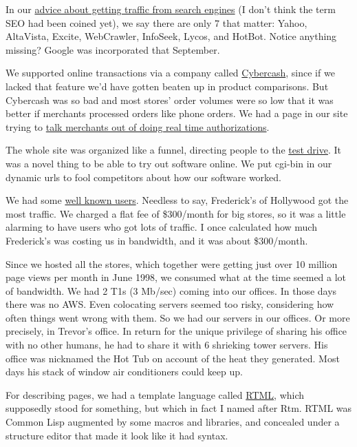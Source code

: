 In our \href{http://ycombinator.com/viaweb/se.html}{advice about getting
traffic from search engines} (I don't think the term SEO had been coined
yet), we say there are only 7 that matter: Yahoo, AltaVista, Excite,
WebCrawler, InfoSeek, Lycos, and HotBot. Notice anything missing? Google
was incorporated that September.

We supported online transactions via a company called
\href{http://en.wikipedia.org/wiki/CyberCash,_Inc.}{Cybercash}, since if
we lacked that feature we'd have gotten beaten up in product
comparisons. But Cybercash was so bad and most stores' order volumes
were so low that it was better if merchants processed orders like phone
orders. We had a page in our site trying to
\href{http://www.ycombinator.com/viaweb/cybercash.html}{talk merchants
out of doing real time authorizations}.

The whole site was organized like a funnel, directing people to the
\href{http://ycombinator.com/viaweb/tesdriv.html}{test drive}. It was a
novel thing to be able to try out software online. We put cgi-bin in our
dynamic urls to fool competitors about how our software worked.

We had some \href{http://ycombinator.com/viaweb/us.html}{well known
users}. Needless to say, Frederick's of Hollywood got the most traffic.
We charged a flat fee of \$300/month for big stores, so it was a little
alarming to have users who got lots of traffic. I once calculated how
much Frederick's was costing us in bandwidth, and it was about
\$300/month.

Since we hosted all the stores, which together were getting just over 10
million page views per month in June 1998, we consumed what at the time
seemed a lot of bandwidth. We had 2 T1s (3 Mb/sec) coming into our
offices. In those days there was no AWS. Even colocating servers seemed
too risky, considering how often things went wrong with them. So we had
our servers in our offices. Or more precisely, in Trevor's office. In
return for the unique privilege of sharing his office with no other
humans, he had to share it with 6 shrieking tower servers. His office
was nicknamed the Hot Tub on account of the heat they generated. Most
days his stack of window air conditioners could keep up.

For describing pages, we had a template language called
\href{http://ycombinator.com/viaweb/rtml.html}{RTML}, which supposedly
stood for something, but which in fact I named after Rtm. RTML was
Common Lisp augmented by some macros and libraries, and concealed under
a structure editor that made it look like it had syntax.

